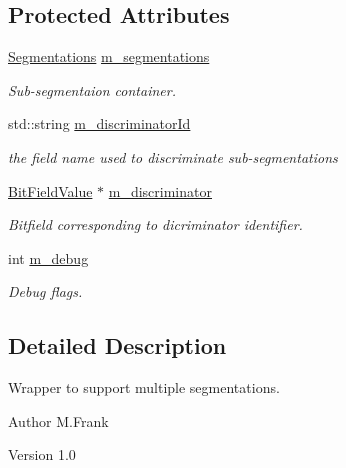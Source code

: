 \subsection*{Protected Attributes}
\begin{DoxyCompactItemize}
\item 
\hyperlink{class_d_d4hep_1_1_d_d_segmentation_1_1_multi_segmentation_a083ba7cc081c5c3c47cafac5980100f8}{Segmentations} \hyperlink{class_d_d4hep_1_1_d_d_segmentation_1_1_multi_segmentation_a9af45d1b08e9f34c17ea27dcdf2e1019}{m\_\-segmentations}
\begin{DoxyCompactList}\small\item\em Sub-\/segmentaion container. \item\end{DoxyCompactList}\item 
std::string \hyperlink{class_d_d4hep_1_1_d_d_segmentation_1_1_multi_segmentation_a922d7825b1c14d0724bfd1711082b943}{m\_\-discriminatorId}
\begin{DoxyCompactList}\small\item\em the field name used to discriminate sub-\/segmentations \item\end{DoxyCompactList}\item 
\hyperlink{class_d_d4hep_1_1_d_d_segmentation_1_1_bit_field_value}{BitFieldValue} $\ast$ \hyperlink{class_d_d4hep_1_1_d_d_segmentation_1_1_multi_segmentation_a5d86769ef20468667fbc44fc6d8b2a4e}{m\_\-discriminator}
\begin{DoxyCompactList}\small\item\em Bitfield corresponding to dicriminator identifier. \item\end{DoxyCompactList}\item 
int \hyperlink{class_d_d4hep_1_1_d_d_segmentation_1_1_multi_segmentation_aa78b5218bf4246b81cf5e74a1233184c}{m\_\-debug}
\begin{DoxyCompactList}\small\item\em Debug flags. \item\end{DoxyCompactList}\end{DoxyCompactItemize}


\subsection{Detailed Description}
Wrapper to support multiple segmentations. \begin{DoxyAuthor}{Author}
M.Frank 
\end{DoxyAuthor}
\begin{DoxyVersion}{Version}
1.0 
\end{DoxyVersion}


